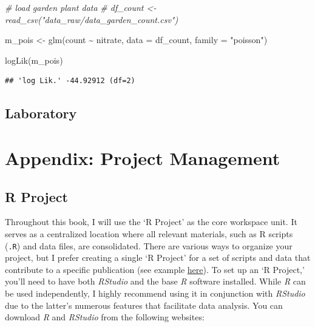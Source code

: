 \documentclass[
]{article}
\newenvironment{Shaded}{\begin{snugshade}}{\end{snugshade}}
\newcommand{\AttributeTok}[1]{\textcolor[rgb]{0.77,0.63,0.00}{#1}}
\newcommand{\CommentTok}[1]{\textcolor[rgb]{0.56,0.35,0.01}{\textit{#1}}}
\newcommand{\FunctionTok}[1]{\textcolor[rgb]{0.00,0.00,0.00}{#1}}
\newcommand{\NormalTok}[1]{#1}
\newcommand{\OtherTok}[1]{\textcolor[rgb]{0.56,0.35,0.01}{#1}}
\newcommand{\SpecialCharTok}[1]{\textcolor[rgb]{0.00,0.00,0.00}{#1}}
\newcommand{\StringTok}[1]{\textcolor[rgb]{0.31,0.60,0.02}{#1}}
\begin{document}
\begin{Shaded}
\begin{Highlighting}[]
\CommentTok{\# load garden plant data}
\CommentTok{\# df\_count \textless{}{-} read\_csv("data\_raw/data\_garden\_count.csv")}

\NormalTok{m\_pois }\OtherTok{\textless{}{-}} \FunctionTok{glm}\NormalTok{(count }\SpecialCharTok{\textasciitilde{}}\NormalTok{ nitrate,}
              \AttributeTok{data =}\NormalTok{ df\_count,}
              \AttributeTok{family =} \StringTok{"poisson"}\NormalTok{)}

\FunctionTok{logLik}\NormalTok{(m\_pois)}
\end{Highlighting}
\end{Shaded}

\begin{verbatim}
## 'log Lik.' -44.92912 (df=2)
\end{verbatim}

\hypertarget{laboratory-8}{%
\subsection{Laboratory}\label{laboratory-8}}

\hypertarget{appendix-project-management}{%
\section{Appendix: Project Management}\label{appendix-project-management}}

\hypertarget{r-project}{%
\subsection{R Project}\label{r-project}}

Throughout this book, I will use the `R Project' as the core workspace unit. It serves as a centralized location where all relevant materials, such as R scripts (\texttt{.R}) and data files, are consolidated. There are various ways to organize your project, but I prefer creating a single `R Project' for a set of scripts and data that contribute to a specific publication (see example \href{https://github.com/aterui/public-proj_stream-diversity}{here}). To set up an `R Project,' you'll need to have both \emph{RStudio} and the base \emph{R} software installed. While \emph{R} can be used independently, I highly recommend using it in conjunction with \emph{RStudio} due to the latter's numerous features that facilitate data analysis. You can download \emph{R} and \emph{RStudio} from the following websites:
\end{document}
